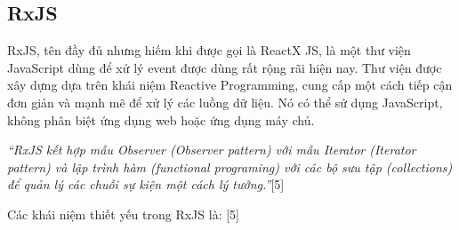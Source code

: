 \subsection{RxJS}

\tab RxJS, tên đầy đủ nhưng hiếm khi được gọi là ReactX JS, là một thư viện JavaScript dùng để xử lý event được dùng rất rộng rãi hiện nay.
Thư viện được xây dựng dựa trên khái niệm Reactive Programming, cung cấp một cách tiếp cận đơn giản và mạnh mẽ để xử lý các luồng dữ liệu.
Nó có thể sử dụng JavaScript, không phân biệt ứng dụng web hoặc ứng dụng máy chủ.
\par

\textit{“RxJS kết hợp mẫu Observer (Observer pattern) với mẫu Iterator (Iterator pattern) và lập trình hàm (functional programing) với các bộ sưu tập (collections) để quản lý các chuỗi sự kiện một cách lý tưởng.”}[5]
\par

Các khái niệm thiết yếu trong RxJS là: [5]


